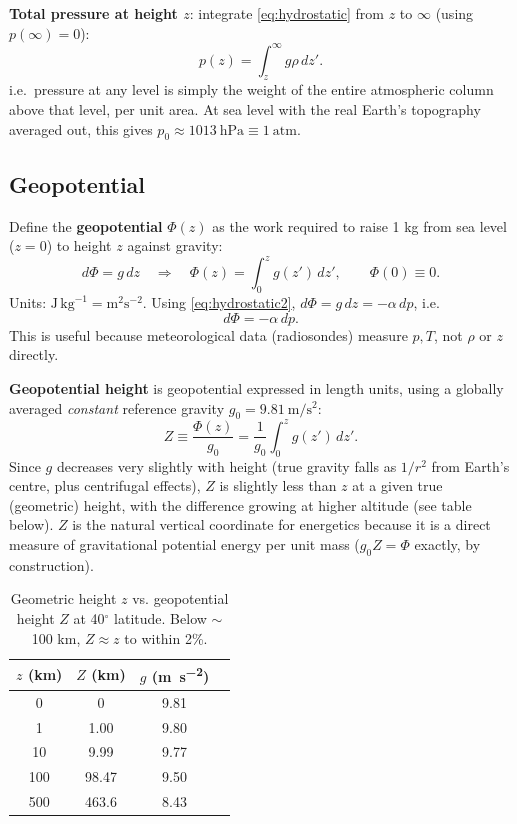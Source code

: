 \documentclass[11pt]{article}
\begin{document}
\textbf{Total pressure at height $z$}: integrate \eqref{eq:hydrostatic} from $z$ to $\infty$ (using $p(\infty)=0$):
\begin{equation}
p(z) = \int_z^{\infty} g\rho\,dz'.
\label{eq:pweight}
\end{equation}
i.e.\ pressure at any level is simply the weight of the entire atmospheric column above that level, per unit area. At sea level with the real Earth's topography averaged out, this gives $p_0 \approx 1013\ \text{hPa} \equiv 1\ \text{atm}$.

\subsection{Geopotential}
Define the \textbf{geopotential} $\Phi(z)$ as the work required to raise 1 kg from sea level ($z=0$) to height $z$ against gravity:
\begin{equation}
d\Phi = g\,dz \quad\Longrightarrow\quad \Phi(z) = \int_0^z g(z')\,dz', \qquad \Phi(0)\equiv 0.
\label{eq:geopotdef}
\end{equation}
Units: $\text{J}\,\text{kg}^{-1} = \text{m}^2\text{s}^{-2}$. Using \eqref{eq:hydrostatic2}, $d\Phi = g\,dz = -\alpha\,dp$, i.e.
\begin{equation}
d\Phi = -\alpha\,dp.
\label{eq:geopotalt}
\end{equation}
This is useful because meteorological data (radiosondes) measure $p,T$, not $\rho$ or $z$ directly.

\textbf{Geopotential height} is geopotential expressed in length units, using a globally averaged \emph{constant} reference gravity $g_0 = 9.81\ \si{\meter\per\second\squared}$:
\begin{equation}
Z \equiv \frac{\Phi(z)}{g_0} = \frac{1}{g_0}\int_0^z g(z')\,dz'.
\label{eq:geopotheight}
\end{equation}
Since $g$ decreases very slightly with height (true gravity falls as $1/r^2$ from Earth's centre, plus centrifugal effects), $Z$ is slightly less than $z$ at a given true (geometric) height, with the difference growing at higher altitude (see table below). $Z$ is the natural vertical coordinate for energetics because it is a direct measure of gravitational potential energy per unit mass ($g_0 Z = \Phi$ exactly, by construction).

\begin{table}[h!]
\centering
\begin{tabular}{@{}cccc@{}}
\toprule
$z$ (km) & $Z$ (km) & $g$ (\si{\meter\per\second\squared}) \\
\midrule
0 & 0 & 9.81 \\
1 & 1.00 & 9.80 \\
10 & 9.99 & 9.77 \\
100 & 98.47 & 9.50 \\
500 & 463.6 & 8.43 \\
\bottomrule
\end{tabular}
\caption{Geometric height $z$ vs. geopotential height $Z$ at 40$^\circ$ latitude. Below $\sim$100 km, $Z\approx z$ to within 2\%.}
\end{table}
\end{document}
